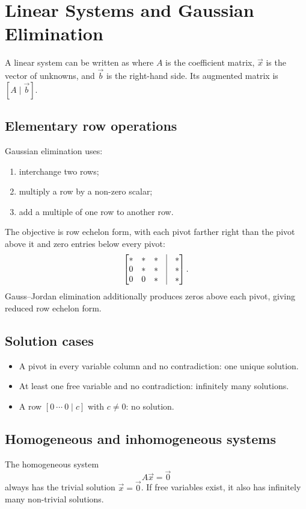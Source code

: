 \documentclass{article}
\begin{document}
\section{Linear Systems and Gaussian Elimination}

A linear system can be written as
where $A$ is the coefficient matrix, $\vec{x}$ is the vector of
unknowns, and $\vec{b}$ is the right-hand side. Its augmented matrix is
$[A\mid\vec{b}]$.

\subsection{Elementary row operations}
Gaussian elimination uses:
\begin{enumerate}
    \item interchange two rows;
    \item multiply a row by a non-zero scalar;
    \item add a multiple of one row to another row.
\end{enumerate}

The objective is row echelon form, with each pivot farther right than
the pivot above it and zero entries below every pivot:
\[
    \begin{bmatrix}
        *&*&*&\vline&*\\
        0&*&*&\vline&*\\
        0&0&*&\vline&*
    \end{bmatrix}.
\]
Gauss--Jordan elimination additionally produces zeros above each pivot,
giving reduced row echelon form.

\subsection{Solution cases}
\begin{itemize}
    \item A pivot in every variable column and no contradiction:
          one unique solution.
    \item At least one free variable and no contradiction:
          infinitely many solutions.
    \item A row $[0\ \cdots\ 0\mid c]$ with $c\neq0$:
          no solution.
\end{itemize}

\subsection{Homogeneous and inhomogeneous systems}
The homogeneous system
\[
    A\vec{x}=\vec{0}
\]
always has the trivial solution $\vec{x}=\vec{0}$. If free variables
exist, it also has infinitely many non-trivial solutions.
\end{document}
